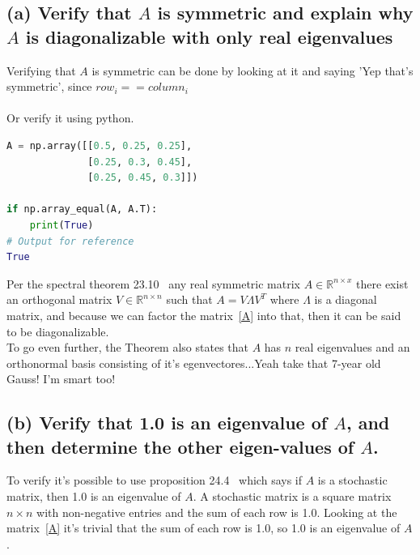 \documentclass[12pt]{article}
\begin{document}
\subsection*{(a) Verify that $A$ is symmetric and explain why $A$ is diagonalizable with only
real eigenvalues}
Verifying that $A$ is symmetric can be done by looking at it and saying 'Yep that's symmetric', since $row_i == column_i$\\\\
Or verify it using python.
\begin{lstlisting}[language=Python]
A = np.array([[0.5, 0.25, 0.25], 
              [0.25, 0.3, 0.45],
              [0.25, 0.45, 0.3]])

if np.array_equal(A, A.T):
    print(True)
# Output for reference
True
\end{lstlisting}
Per the spectral theorem 23.10~\cite{NUMLA} any real symmetric matrix $A \in \mathbb{R}^{n \times x}$ there exist an orthogonal
 matrix $V \in \mathbb{R}^{n \times n}$ such that $A = V \Lambda V^T$ where $\Lambda$ is
 a diagonal matrix, and because we can factor the matrix~\eqref{A} into that, then it can be said to be diagonalizable.\\
 To go even further, the Theorem also states that $A$ has $n$ real eigenvalues and an orthonormal basis consisting of it's egenvectores...Yeah take that 7-year old Gauss! I'm smart too!

\subsection*{(b) Verify that 1.0 is an eigenvalue of $A$, and then determine the other eigen-values of $A$.}
To verify it's possible to use proposition 24.4~\cite{NUMLA} which says if $A$ is a stochastic matrix, then 1.0 is an eigenvalue of $A$.
 A stochastic matrix is a square matrix $n \times n$ with non-negative entries and the sum of each row is 1.0. Looking at the matrix~\eqref{A} it's trivial
  that the sum of each row is 1.0, so 1.0 is an eigenvalue of $A$.\\\\
\end{document}
